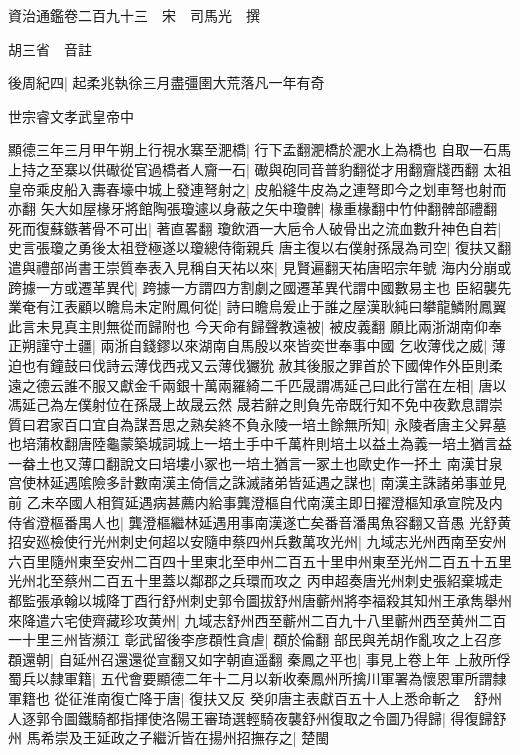 資治通鑑卷二百九十三　宋　司馬光　撰

胡三省　音註

後周紀四|{
	起柔兆執徐三月盡彊圉大荒落凡一年有奇}


世宗睿文孝武皇帝中

顯德三年三月甲午朔上行視水寨至淝橋|{
	行下孟翻淝橋於淝水上為橋也}
自取一石馬上持之至寨以供礮從官過橋者人齎一石|{
	礮與砲同音普豹翻從才用翻齎牋西翻}
太祖皇帝乘皮船入夀春壕中城上發連弩射之|{
	皮船縫牛皮為之連弩即今之划車弩也射而亦翻}
矢大如屋椽牙將館陶張瓊遽以身蔽之矢中瓊髀|{
	椽重椽翻中竹仲翻髀部禮翻}
死而復蘇鏃著骨不可出|{
	著直畧翻}
瓊飲酒一大巵令人破骨出之流血數升神色自若|{
	史言張瓊之勇後太祖登極遂以瓊總侍衛親兵}
唐主復以右僕射孫晟為司空|{
	復扶又翻}
遣與禮部尚書王崇質奉表入見稱自天祐以來|{
	見賢遍翻天祐唐昭宗年號}
海内分崩或跨據一方或遷革異代|{
	跨據一方謂四方割劇之國遷革異代謂中國數易主也}
臣紹襲先業奄有江表顧以瞻烏未定附鳳何從|{
	詩曰瞻烏爰止于誰之屋漢耿純曰攀龍鱗附鳳翼此言未見真主則無從而歸附也}
今天命有歸聲教遠被|{
	被皮義翻}
願比兩浙湖南仰奉正朔謹守土疆|{
	兩浙自錢鏐以來湖南自馬殷以來皆奕世奉事中國}
乞收薄伐之威|{
	薄迫也有鐘鼓曰伐詩云薄伐西戎又云薄伐玁狁}
赦其後服之罪首於下國俾作外臣則柔遠之德云誰不服又獻金千兩銀十萬兩羅綺二千匹晟謂馮延己曰此行當在左相|{
	唐以馮延己為左僕射位在孫晟上故晟云然}
晟若辭之則負先帝既行知不免中夜歎息謂崇質曰君家百口宜自為謀吾思之熟矣終不負永陵一培土餘無所知|{
	永陵者唐主父昇墓也培蒲枚翻唐陸龜蒙築城詞城上一培土手中千萬杵則培土以益土為義一培土猶言益一畚土也又薄口翻說文曰培塿小冢也一培土猶言一冢土也歐史作一抔土}
南漢甘泉宫使林延遇隂險多計數南漢主倚信之誅滅諸弟皆延遇之謀也|{
	南漢主誅諸弟事並見前}
乙未卒國人相賀延遇病甚薦内給事龔澄樞自代南漢主即日擢澄樞知承宣院及内侍省澄樞番禺人也|{
	龔澄樞繼林延遇用事南漢遂亡矣番音潘禺魚容翻又音愚}
光舒黄招安廵檢使行光州刺史何超以安隨申蔡四州兵數萬攻光州|{
	九域志光州西南至安州六百里隨州東至安州二百四十里東北至申州二百五十里申州東至光州二百五十五里光州北至蔡州二百五十里蓋以鄰郡之兵環而攻之}
丙申超奏唐光州刺史張紹棄城走都監張承翰以城降丁酉行舒州刺史郭令圖拔舒州唐蘄州將李福殺其知州王承雋舉州來降遣六宅使齊藏珍攻黄州|{
	九域志舒州西至蘄州二百九十八里蘄州西至黄州二百一十里三州皆瀕江}
彰武留後李彦頵性貪虐|{
	頵於倫翻}
部民與羌胡作亂攻之上召彦頵還朝|{
	自延州召還還從宣翻又如字朝直遥翻}
秦鳳之平也|{
	事見上卷上年}
上赦所俘蜀兵以隸軍籍|{
	五代會要顯德二年十二月以新收秦鳳州所擒川軍署為懷恩軍所謂隸軍籍也}
從征淮南復亡降于唐|{
	復扶又反}
癸卯唐主表獻百五十人上悉命斬之　舒州人逐郭令圖鐵騎都指揮使洛陽王審琦選輕騎夜襲舒州復取之令圖乃得歸|{
	得復歸舒州}
馬希崇及王延政之子繼沂皆在揚州招撫存之|{
	楚閩}


